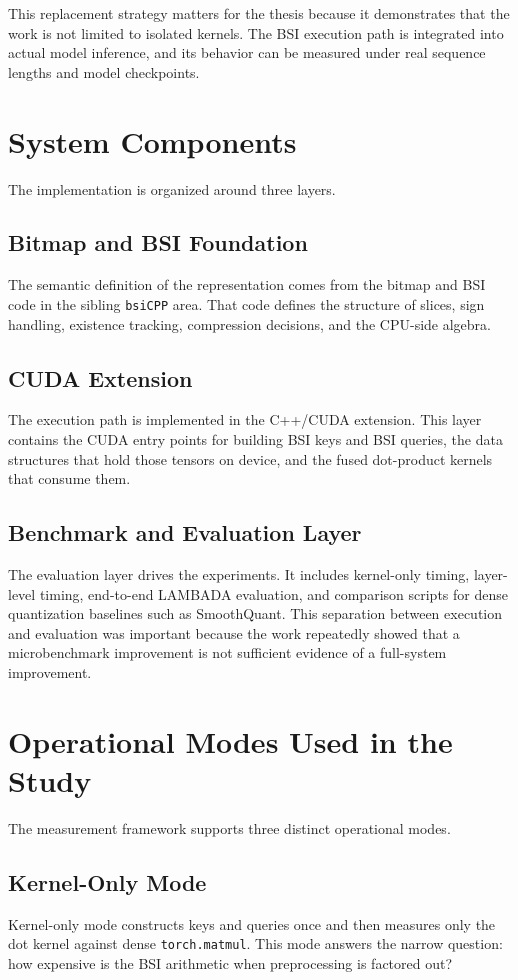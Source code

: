 This replacement strategy matters for the thesis because it demonstrates that the work is not limited to isolated kernels. The BSI execution path is integrated into actual model inference, and its behavior can be measured under real sequence lengths and model checkpoints.

\section{System Components}
The implementation is organized around three layers.

\subsection{Bitmap and BSI Foundation}
The semantic definition of the representation comes from the bitmap and BSI code in the sibling \texttt{bsiCPP} area. That code defines the structure of slices, sign handling, existence tracking, compression decisions, and the CPU-side algebra.

\subsection{CUDA Extension}
The execution path is implemented in the C++/CUDA extension. This layer contains the CUDA entry points for building BSI keys and BSI queries, the data structures that hold those tensors on device, and the fused dot-product kernels that consume them.

\subsection{Benchmark and Evaluation Layer}
The evaluation layer drives the experiments. It includes kernel-only timing, layer-level timing, end-to-end LAMBADA evaluation, and comparison scripts for dense quantization baselines such as SmoothQuant. This separation between execution and evaluation was important because the work repeatedly showed that a microbenchmark improvement is not sufficient evidence of a full-system improvement.

\section{Operational Modes Used in the Study}
The measurement framework supports three distinct operational modes.

\subsection{Kernel-Only Mode}
Kernel-only mode constructs keys and queries once and then measures only the dot kernel against dense \texttt{torch.matmul}. This mode answers the narrow question: how expensive is the BSI arithmetic when preprocessing is factored out?

